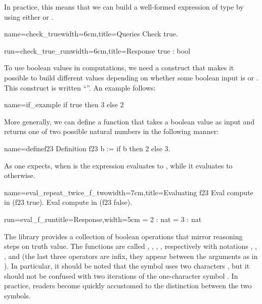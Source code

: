 In practice, this means that we can build a well-formed expression of
type  by using either  or . 

\begin{coq}{name=check_true}{width=6cm,title=Queries}
Check true.
\end{coq}
\begin{coqout}{run=check_true_run}{width=6cm,title=Response}
true : bool
\end{coqout}

To use boolean values in computations, we need a construct that makes
it possible to build different values depending on whether some
boolean input is  or .  This construct is written
``''.  An example follows:

\begin{coq}{name=if_example}{}
if true then 3 else 2
\end{coq}
More generally, we can define a function that takes a boolean value as
input and returns one of two possible natural numbers in the following
manner:

\begin{coq}{name=definef23}{}
Definition f23 b := if b then 2 else 3.
\end{coq}

As one expects, when  is  the expression
 evaluates to , while it evaluates to  otherwise.

\begin{coq}{name=eval_repeat_twice_f_two}{width=7cm,title=Evaluating f23}
Eval compute in (f23 true).
Eval compute in (f23 false).
\end{coq}
\begin{coqout}{run=eval_f_run}{title=Response,width=5cm}
  = 2 : nat
  = 3 : nat
\end{coqout}

The \mcbMC{} library provides a collection of boolean operations that
mirror reasoning steps on truth value.  The functions are called
, ,  , , respectively with notations
\C{\~\~},  \C{||}, \C{&&}, and \C{==>} (the last three operators are
infix, they appear between the arguments as in ).
  In
particular, it should be
noted that the symbol \C{\~\~} uses two characters \C{\~}, but it should
not be confused with two iterations of the one-character symbol
\C{\~}.  In practice, readers become quickly accustomed to the
distinction between the two symbols.

